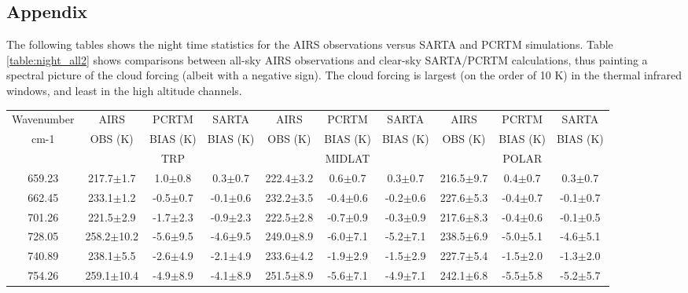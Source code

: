 \documentclass[agupp]{aguplus}              %
\begin{document}
\begin{article}
\section{Appendix} 

The following tables shows the night time statistics for the AIRS
observations versus SARTA and PCRTM simulations.  Table
\ref{table:night_all2} shows comparisons between all-sky AIRS
observations and clear-sky SARTA/PCRTM calculations, thus painting a
spectral picture of the cloud forcing (albeit with a negative
sign). The cloud forcing is largest (on the order of 10 K) in the
thermal infrared windows, and least in the high altitude channels.

\begin{center}
\begin{table}[ht]
{\footnotesize
\hfill{}
\begin{tabular}{c|ccc|ccc|ccc} %
Wavenumber & AIRS   & PCRTM    & SARTA    & AIRS   & PCRTM    & SARTA    & AIRS   & PCRTM    & SARTA \\
cm-1       & OBS (K)& BIAS (K) & BIAS (K) & OBS (K)& BIAS (K) & BIAS (K) & OBS (K)& BIAS (K) & BIAS (K) \\
           &        & TRP      &          &        & MIDLAT   &          &        & POLAR    &       \\
\hline
659.23 & 217.7$\pm$1.7 &  1.0$\pm$0.8 &  0.3$\pm$0.7 & 222.4$\pm$3.2 &  0.6$\pm$0.7 &  0.3$\pm$0.7 & 216.5$\pm$9.7 &  0.4$\pm$0.7 &  0.3$\pm$0.7 \\ 
662.45 & 233.1$\pm$1.2 & -0.5$\pm$0.7 & -0.1$\pm$0.6 & 232.2$\pm$3.5 & -0.4$\pm$0.6 & -0.2$\pm$0.6 & 227.6$\pm$5.3 & -0.4$\pm$0.7 & -0.1$\pm$0.7 \\ 
701.26 & 221.5$\pm$2.9 & -1.7$\pm$2.3 & -0.9$\pm$2.3 & 222.5$\pm$2.8 & -0.7$\pm$0.9 & -0.3$\pm$0.9 & 217.6$\pm$8.3 & -0.4$\pm$0.6 & -0.1$\pm$0.5 \\ 
728.05 & 258.2$\pm$10.2 & -5.6$\pm$9.5 & -4.6$\pm$9.5 & 249.0$\pm$8.9 & -6.0$\pm$7.1 & -5.2$\pm$7.1 & 238.5$\pm$6.9 & -5.0$\pm$5.1 & -4.6$\pm$5.1 \\ 
740.89 & 238.1$\pm$5.5 & -2.6$\pm$4.9 & -2.1$\pm$4.9 & 233.6$\pm$4.2 & -1.9$\pm$2.9 & -1.5$\pm$2.9 & 227.7$\pm$5.4 & -1.5$\pm$2.0 & -1.3$\pm$2.0 \\ 
754.26 & 259.1$\pm$10.4 & -4.9$\pm$8.9 & -4.1$\pm$8.9 & 251.5$\pm$8.9 & -5.6$\pm$7.1 & -4.9$\pm$7.1 & 242.1$\pm$6.8 & -5.5$\pm$5.8 & -5.2$\pm$5.7 \\ 

\end{tabular}}
\end{table}
\end{center}
\end{article}
\end{document}
